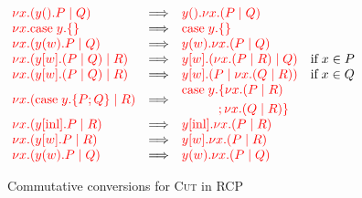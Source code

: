 \begin{figure*}
  \centering
  \(\!
  \begin{array}{lclr}
    \red{ \cut{x}(\wait{y}P \mid Q) }
    &\Longrightarrow&
    \red{ \wait{y}\cut{x}(P \mid Q) }
    \\
    \red{ \cut{x}\case{y}{}{} }
    &\Longrightarrow&
    \red{ \case{y}{}{} }
    \\
    \red{ \cut{x}(\recv{y}{w}P \mid Q) }
    &\Longrightarrow&
    \red{ \recv{y}{w}\cut{x}(P \mid Q) }
    \\
    \red{ \cut{x}(\send{y}{w}(P \mid Q) \mid R) }
    &\Longrightarrow&
    \red{ \send{y}{w}(\cut{x}(P \mid R) \mid Q) }
    &\text{if} \; x \in P
    \\
    \red{ \cut{x}(\send{y}{w}(P \mid Q) \mid R) }
    &\Longrightarrow&
    \red{ \send{y}{w}(P \mid \cut{x}(Q \mid R)) }
    &\text{if} \; x \in Q
    \\
    \red{ \cut{x}(\case{y}{P}{Q} \mid R) }
    &\Longrightarrow&
    \!\begin{aligned}
      \red{ \text{case}\;y.}
      &\red{\{\cut{x}(P \mid R)}\\
      &\red{ ;\cut{x}(Q \mid R)\}}
    \end{aligned}
    \\
    \red{ \cut{x}(\inl{y}P \mid R) }
    &\Longrightarrow&
    \red{ \inl{y}\cut{x}(P \mid R) }
    \\
    \red{ \cut{x}(\send{y}{w}P \mid R) }
    &\Longrightarrow&
    \red{ \send{y}{w}\cut{x}(P \mid R) }
    \\
    \red{ \cut{x}(\recv{y}{w}P \mid Q) }
    &\Longrightarrow&
    \red{ \recv{y}{w}\cut{x}(P \mid Q) }
  \end{array}
  \)
  \caption{Commutative conversions for \textsc{Cut} in RCP}
  \label{fig:cp-cut-cc}
\end{figure*}

